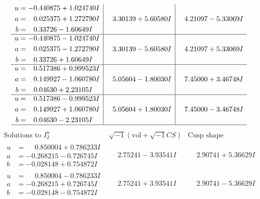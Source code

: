 \documentclass[1p]{elsarticle_modified}
\theoremstyle{definition}
\newcommand{\I}{\sqrt{-1}}
\begin{document}
$$\begin{array}{c|c|c}
\begin{aligned}
u &= -0.440875 + 1.024740 I \\
a &= \phantom{-}0.025375 + 1.272790 I \\
b &= \phantom{-}0.33726 - 1.60649 I\end{aligned}
 & \phantom{-}3.30139 + 5.60580 I & \phantom{-}4.21097 - 5.33069 I \\ \hline\begin{aligned}
u &= -0.440875 - 1.024740 I \\
a &= \phantom{-}0.025375 - 1.272790 I \\
b &= \phantom{-}0.33726 + 1.60649 I\end{aligned}
 & \phantom{-}3.30139 - 5.60580 I & \phantom{-}4.21097 + 5.33069 I \\ \hline\begin{aligned}
u &= \phantom{-}0.517386 + 0.999523 I \\
a &= \phantom{-}0.149927 - 1.060780 I \\
b &= \phantom{-}0.04630 + 2.23105 I\end{aligned}
 & \phantom{-}5.05604 - 1.80030 I & \phantom{-}7.45000 + 3.46748 I \\ \hline\begin{aligned}
u &= \phantom{-}0.517386 - 0.999523 I \\
a &= \phantom{-}0.149927 + 1.060780 I \\
b &= \phantom{-}0.04630 - 2.23105 I\end{aligned}
 & \phantom{-}5.05604 + 1.80030 I & \phantom{-}7.45000 - 3.46748 I\\
 \hline 
 \end{array}$$\newpage$$\begin{array}{c|c|c}  
\text{Solutions to }I^u_{2}& \I (\text{vol} + \sqrt{-1}CS) & \text{Cusp shape}\\
 \hline 
\begin{aligned}
u &= \phantom{-}0.850004 + 0.786233 I \\
a &= -0.268215 - 0.726745 I \\
b &= -0.028148 + 0.754872 I\end{aligned}
 & \phantom{-}2.75241 - 3.93541 I & \phantom{-}2.90741 + 5.36629 I \\ \hline\begin{aligned}
u &= \phantom{-}0.850004 - 0.786233 I \\
a &= -0.268215 + 0.726745 I \\
b &= -0.028148 - 0.754872 I\end{aligned}
 & \phantom{-}2.75241 + 3.93541 I & \phantom{-}2.90741 - 5.36629 I \\ \hline\begin{aligned}

\end{aligned}
\end{array}$$
\end{document}
